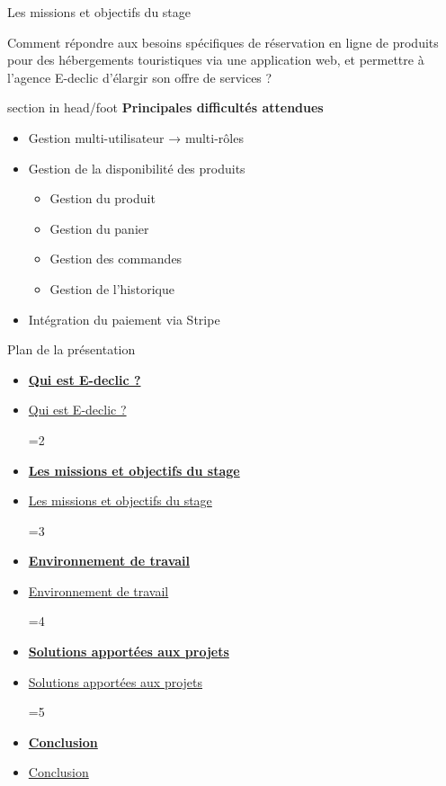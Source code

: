 \documentclass{beamer}
\newcommand{\planLine}[4]{
  \ifnum#1=#2
    \item \hyperlink{#3}{\textbf{\large #4}}
  \else
    \item \hyperlink{#3}{#4}
  \fi
}
\newcommand{\planSlide}[1]{
  	\begin{frame}{Plan de la présentation}
  		\begin{center}
  			\begin{minipage}{1\textwidth}
				\begin{itemize}
      			\planLine{#1}{1}{organisation}{Qui est E-declic ?}
      			\planLine{#1}{2}{sujet}{Les missions et objectifs du stage}
      			\planLine{#1}{3}{environnement}{Environnement de travail}
      			\planLine{#1}{4}{realisation}{Solutions apportées aux projets}
      			\planLine{#1}{5}{conclusion}{Conclusion}
	    		\end{itemize}
  		\end{minipage}
	\end{center}
	\vfill
	\end{frame}
}
\begin{document}
\begin{frame}{Les missions et objectifs du stage}

	Comment répondre aux besoins spécifiques de réservation en ligne de produits pour des hébergements touristiques via une application web, et permettre à l’agence E-declic d’élargir son offre de services ?
			
	\begin{center}
  		\begin{minipage}{0.9\textwidth}
			\begin{beamercolorbox}[wd=\paperwidth,ht=1.5em,dp=0.5em,leftskip=0.5cm]{section in head/foot}
  				\large \textbf{Principales difficultés attendues}
			\end{beamercolorbox}
			
			\begin{itemize}
				\item<1-> Gestion multi-utilisateur → multi-rôles
				\item<2-> Gestion de la disponibilité des produits
				\begin{itemize}
					\item Gestion du produit
					\item Gestion du panier
					\item Gestion des commandes
					\item Gestion de l'historique
				\end{itemize}
				\item<3-> Intégration du paiement via Stripe
			\end{itemize}
  			\vspace{1cm}
  		\end{minipage}
	\end{center}
	\vfill
\end{frame}

\planSlide{3}
\end{document}
